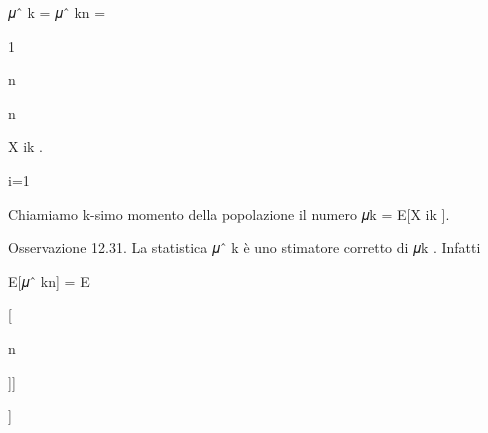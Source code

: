 \documentclass[a4paper,portrait,12pt]{article}
\begin{document}
\begin{flushleft}
𝜇ˆ k = 𝜇ˆ kn =
\end{flushleft}





1


\begin{flushleft}
n
\end{flushleft}





\begin{flushleft}
n
\end{flushleft}





\begin{flushleft}
X ik .
\end{flushleft}





\begin{flushleft}
i=1
\end{flushleft}





\begin{flushleft}
Chiamiamo k-simo momento della popolazione il numero 𝜇k = E[X ik ].
\end{flushleft}


\begin{flushleft}
Osservazione 12.31. La statistica 𝜇ˆ k \`{e} uno stimatore corretto di 𝜇k . Infatti
\end{flushleft}


\begin{flushleft}
E[𝜇ˆ kn] = E
\end{flushleft}





\begin{flushleft}
[[ n1
\end{flushleft}


[





\begin{flushleft}
n
\end{flushleft}





]]


]
\end{document}
